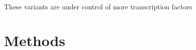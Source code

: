 These variants are under control of more transcription factors




%
%
%
%
%
%
%
%
%

\section*{Methods}\label{sec:methods}

